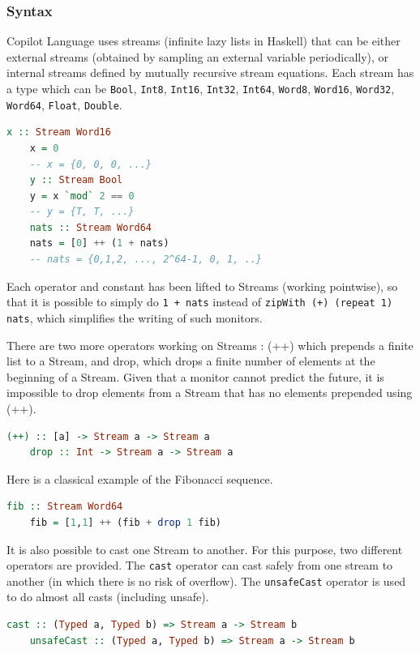 \documentclass[a4paper,11pt,final]{article}
\begin{document}
	\subsubsection{Syntax}
	Copilot Language uses streams (infinite lazy lists in Haskell) that can be either external streams (obtained by sampling an external variable periodically), or internal streams defined by mutually recursive stream equations. Each stream has a type which can be \texttt{Bool}, \texttt{Int8}, \texttt{Int16}, \texttt{Int32}, \texttt{Int64}, \texttt{Word8}, \texttt{Word16}, \texttt{Word32}, \texttt{Word64}, \texttt{Float}, \texttt{Double}.
	
	\begin{lstlisting}[language=Haskell]
	x :: Stream Word16
	x = 0
	-- x = {0, 0, 0, ...}
	y :: Stream Bool
	y = x `mod` 2 == 0
	-- y = {T, T, ...}
	nats :: Stream Word64
	nats = [0] ++ (1 + nats)
	-- nats = {0,1,2, ..., 2^64-1, 0, 1, ..}  \end{lstlisting}
	
	Each operator and constant has been lifted to Streams (working pointwise), so that it is possible to simply do \texttt{1 + nats} instead of \texttt{zipWith (+) (repeat 1) nats}, which simplifies the writing of such monitors. 
	
	There are two more operators working on Streams : (++) which prepends a finite list to a Stream, and drop, which drops a finite number of elements at the beginning of a Stream. Given that a monitor cannot predict the future, it is impossible to drop elements from a Stream that has no elements prepended using (++).
	
	\begin{lstlisting}[language=Haskell]
	(++) :: [a] -> Stream a -> Stream a
	drop :: Int -> Stream a -> Stream a  \end{lstlisting}
	
	Here is a classical example of the Fibonacci sequence.
	
	\begin{lstlisting}[language=Haskell]
	fib :: Stream Word64
	fib = [1,1] ++ (fib + drop 1 fib)  \end{lstlisting}
	
	It is also possible to cast one Stream to another. For this purpose, two different operators are provided. The \texttt{cast} operator can cast safely from one stream to another (in which there is no risk of overflow). The \texttt{unsafeCast} operator is used to do almost all casts (including unsafe).
	\begin{lstlisting}[language=Haskell]
	cast :: (Typed a, Typed b) => Stream a -> Stream b
	unsafeCast :: (Typed a, Typed b) => Stream a -> Stream b
	\end{lstlisting}
	
\end{document}
